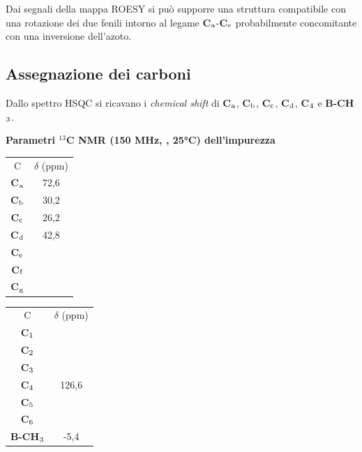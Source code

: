 \documentclass[a4paper, italian, oneside, 12pt]{article}
\begin{document}
Dai segnali della mappa ROESY si può supporre una struttura compatibile con una rotazione dei due fenili intorno al legame {\bf{C$_{\textrm a}$}}-{\bf{C$_{\textrm e}$}} probabilmente concomitante con una inversione dell'azoto.

\subsection{Assegnazione dei carboni}
Dallo spettro HSQC si ricavano i {\emph{chemical shift}} di {\bf{C$_{\textrm a}$}}, {\bf{C$_{\textrm b}$}}, {\bf{C$_{\textrm c}$}}, {\bf{C$_{\textrm d}$}}, {\bf{C$_{\textrm 4}$}} e {\bf{B-CH$_{\textrm 3}$}}.

{%
\begin{table}[ht]
\begin{center}

 {\bf{Parametri $^{13}$C NMR (150 MHz, , 25°C) dell'impurezza}}\end{center}

\begin{multicols}{2}
\begin{center}
\begin{tabular}{c|c}
\toprule
C & $\delta $ (ppm)\\\cmidrule(r){1-1}\cmidrule(l){2-2}

{\bf{C$_{\textrm a}$}} &
 72,6\\{\bf{C$_{\textrm b}$}} &
 30,2\\{\bf{C$_{\textrm c}$}} &
 26,2\\{\bf{C$_{\textrm d}$}} &
 42,8\\{\bf{C$_{\textrm e}$}} &
\\{\bf{C$_{\textrm f}$}} &
\\{\bf{C$_{\textrm g}$}} &\\\bottomrule
\end{tabular}
\end{center}
\columnbreak
\begin{center}
\begin{tabular}{c|c}
\toprule
C & $\delta $ (ppm)\\\cmidrule(r){1-1}\cmidrule(l){2-2}
{\bf{C$_{\textrm 1}$}} &
\\{\bf{C$_{\textrm 2}$}} &
\\{\bf{C$_{\textrm 3}$}} &
\\{\bf{C$_{\textrm 4}$}} &
 126,6\\{\bf{C$_{\textrm 5}$}} &
\\{\bf{C$_{\textrm 6}$}} &
\\{\bf{B-CH$_{\textrm 3}$}} &
 -5,4\\\bottomrule
\end{tabular}
\end{center}
\end{multicols}
\end{table}}
\end{document}
